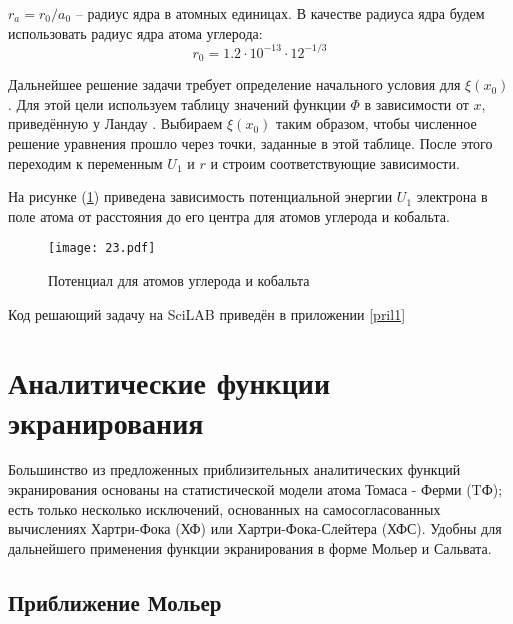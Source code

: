 \documentclass[a4paper,14pt]{extarticle} %
\begin{document}
$r_a = r_0/a_0$ -- радиус ядра в атомных единицах. В качестве радиуса ядра будем использовать радиус ядра атома углерода:
\[
	r_0 = 				
1{.}2\cdot10^{-13}\cdot12^{-1/3}
\]

%	

Дальнейшее решение задачи требует определение начального условия для $\xi(x_0)$. Для этой цели используем таблицу значений функции $\Phi$ в зависимости от $x$, приведённую у Ландау \cite{Landau}. Выбираем $\xi(x_0)$ таким образом, чтобы численное решение уравнения прошло через точки, заданные в этой таблице. После этого переходим к переменным $U_1$ и $r$ и строим соответствующие зависимости.
	
	На рисунке (\ref{ris: 2.3}) приведена зависимость потенциальной энергии $U_1$ электрона в поле атома от расстояния до его центра для атомов углерода и кобальта.
	
	\begin{figure}[ht]
	\centering
	\caption{Потенциал для атомов углерода и кобальта}
	\label{ris: 2.3}
	\texttt{[image: 23.pdf]}
	\end{figure}
	
	Код решающий задачу на SciLAB приведён в приложении \ref{pril1}

\section{Аналитические функции экранирования}

Большинство из предложенных приблизительных аналитических функций 
экранирования основаны на статистической модели атома Томаса - Ферми 
(TФ); есть только несколько исключений, основанных на самосогласованных 
вычислениях Хартри-Фока (ХФ) или Хартри-Фока-Слейтера (ХФС). Удобны для дальнейшего применения функции экранирования в форме Мольер и Сальвата.

\subsection{Приближение Мольер}
\end{document}
